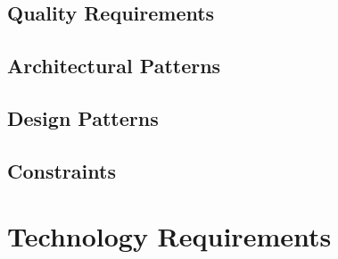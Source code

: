 \documentclass[a4paper,12pt]{article}
\begin{document}
\subsection{Quality Requirements}
\label{subsec:quality-requirements}

\subsection{Architectural Patterns}
\label{subsec:architectural-patterns}

\subsection{Design Patterns}
\label{subsec:design-patterns}

\subsection{Constraints}
\label{subsec:constraints}

\section{Technology Requirements}
\label{sec:technology-requirements}
\end{document}

